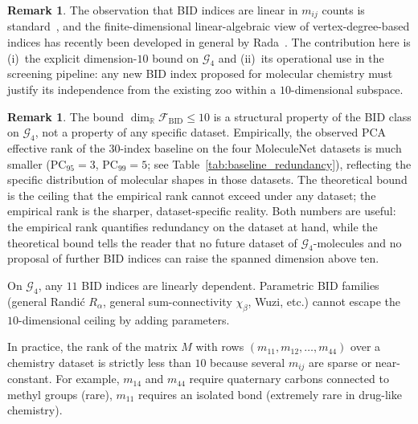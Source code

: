 \documentclass[STIX1COL]{WileyNJDv5}
\theoremstyle{definition}
\newtheorem{remark}[theorem]{Remark}
\newcommand{\bid}{\mathcal{F}_{\mathrm{BID}}}
\begin{document}
\begin{remark}\label{rem:bid_credit}
The observation that BID indices are linear in $m_{ij}$ counts is
standard~\cite{BorovicaninDasFurtulaGutman2017Zagreb}, and the
finite-dimensional linear-algebraic view of vertex-degree-based
indices has recently been developed in general by
Rada~\cite{Rada2026LinearVDB}. The contribution here is
(i)~the explicit dimension-$10$ bound on $\mathcal{G}_4$ and
(ii)~its operational use in the screening pipeline: any new BID
index proposed for molecular chemistry must justify its
independence from the existing zoo within a $10$-dimensional
subspace.
\end{remark}

\begin{remark}\label{rem:rank_vs_bound}
The bound $\dim_{\mathbb{R}}\bid \le 10$ is a structural property
of the BID class on $\mathcal{G}_4$, not a property of any
specific dataset. Empirically, the observed PCA effective rank of
the $30$-index baseline on the four MoleculeNet datasets is much
smaller ($\mathrm{PC}_{95}=3$, $\mathrm{PC}_{99}=5$; see
Table~\ref{tab:baseline_redundancy}), reflecting the specific
distribution of molecular shapes in those datasets. The
theoretical bound is the ceiling that the empirical rank
cannot exceed under any dataset; the empirical rank is the
sharper, dataset-specific reality. Both numbers are useful: the
empirical rank quantifies redundancy on the dataset at hand,
while the theoretical bound tells the reader that no future
dataset of $\mathcal{G}_4$-molecules and no proposal of further
BID indices can raise the spanned dimension above ten.
\end{remark}

\begin{corollary}\label{cor:bid_redundancy}
On $\mathcal{G}_4$, any $11$ BID indices are linearly dependent.
Parametric BID families (general Randi\'c $R_\alpha$, general
sum-connectivity $\chi_\beta$, Wuzi, etc.) cannot escape the
$10$-dimensional ceiling by adding parameters.
\end{corollary}

In practice, the rank of the matrix $M$ with rows
$(m_{11}, m_{12}, \ldots, m_{44})$ over a chemistry dataset is
strictly less than $10$ because several $m_{ij}$ are sparse or
near-constant. For example, $m_{14}$ and $m_{44}$ require
quaternary carbons connected to methyl groups (rare),
$m_{11}$ requires an isolated bond (extremely rare in drug-like
chemistry).

\end{document}

